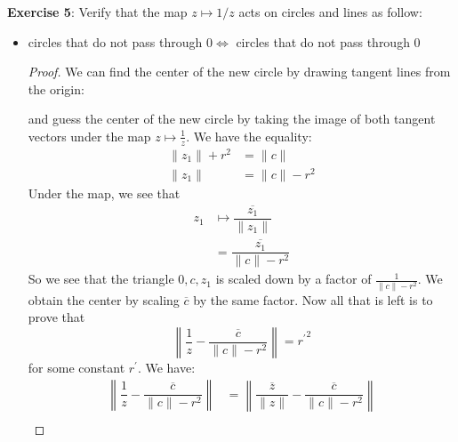 \documentclass{article}
\begin{document}
\textbf{Exercise 5}: Verify that the map $z \mapsto 1/z$ acts on circles and lines as follow:
    \begin{itemize}
        \item circles that do not pass through $0 \iff $ circles that do not pass through $0$
            \begin{proof}
                We can find the center of the new circle by drawing tangent lines from the origin:
                    \begin{fixedfigure}
                    \end{fixedfigure}
                and guess the center of the new circle by taking the image of both tangent vectors under the map $z \mapsto \frac{1}{z}$. We have the equality:
                    \begin{align*}
                        \lVert z_{1} \rVert + r^{2} &= \lVert c \rVert         \\
                        \lVert z_{1} \rVert         &= \lVert c \rVert - r^{2}   
                    \end{align*}
                Under the map, we see that 
                    \begin{align*}
                        z_{1} &\mapsto \dfrac{\overline{z_{1}}}{\lVert z_{1} \rVert}     \\
                              &=       \dfrac{\overline{z_{1}}}{\lVert c \rVert - r^{2}}   
                    \end{align*}
                So we see that the triangle $0, c, z_{1}$ is scaled down by a factor of $\frac{1}{\lVert c \rVert - r^{2}}$. We obtain the center by scaling $\overline{c}$ by the same factor. Now all that is left is to prove that 
                    \begin{equation*}
                        \left\lVert \dfrac{1}{z} - \dfrac{\overline{c}}{\lVert c \rVert - r^{2}} \right\rVert = {r^{\prime}}^{2}
                    \end{equation*}
                for some constant $r^{\prime}$. We have:
                    \begin{align*}
                        \left\lVert \dfrac{1}{z} - \dfrac{\overline{c}}{\lVert c \rVert - r^{2}} \right\rVert &= \left\lVert \dfrac{\overline{z}}{\lVert z \rVert} - \dfrac{\overline{c}}{\lVert c \rVert - r^{2}} \right\rVert                                                                                                           \\

\end{align*}
\end{proof}
\end{itemize}
\end{document}
